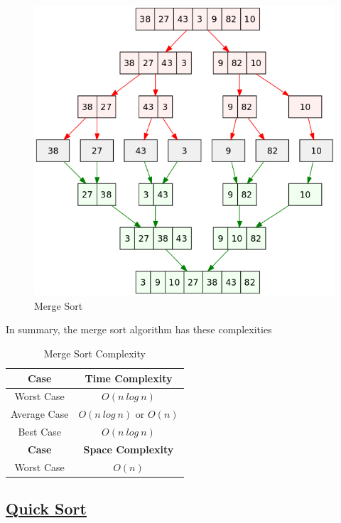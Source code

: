 \documentclass{article}
\begin{document}
\begin{figure}[H]
  \centering
  \includegraphics[scale=0.4]{./Merge_sort_algorithm_diagram.png}
  \caption{Merge Sort}
  \label{fig:Merge Sort}
\end{figure}

In summary, the merge sort algorithm has these complexities

\begin{table}[H]
  \begin{center}
    \label{tab:Merge Sort Complexity}
    \begin{tabular}{c|c}
      \toprule
      \textbf{Case} & \textbf{Time Complexity} \\
      \midrule
      Worst Case & $O(n\ log\ n)$ \\
      Average Case & $O(n\ log\ n)$ or $O(n)$ \\
      Best Case & $O(n\ log\ n)$ \\
      \bottomrule
      \toprule
      \textbf{Case} & \textbf{Space Complexity} \\
      \midrule
      Worst Case & $O(n)$ \\
    \end{tabular}
    \caption{Merge Sort Complexity}
  \end{center}
\end{table}

\subsection{\underline{Quick Sort}}
\end{document}
